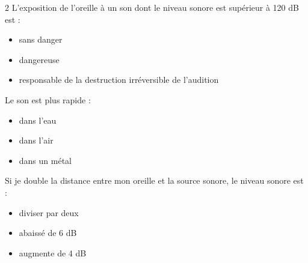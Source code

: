 \documentclass[11pt,a4paper]{article}
\begin{document}
\begin{multicols}{2}
 L'exposition de l'oreille à un son dont le niveau sonore est supérieur à 120 dB est : 
\begin{itemize}[label=$\square$]
	\item sans danger
	\item dangereuse
	\item responsable de la destruction irréversible de l'audition
\end{itemize}

 Le son est plus rapide : 
\begin{itemize}[label=$\square$]
	\item dans l'eau
	\item dans l'air
	\item dans un métal
\end{itemize}

  Si je double la distance entre mon oreille et la source sonore, le niveau sonore est :
\begin{itemize}[label=$\square$]
	\item diviser par deux
	\item abaissé de 6 dB
	\item augmente de 4 dB
\end{itemize}

\end{multicols}

\newpage
\end{document}

